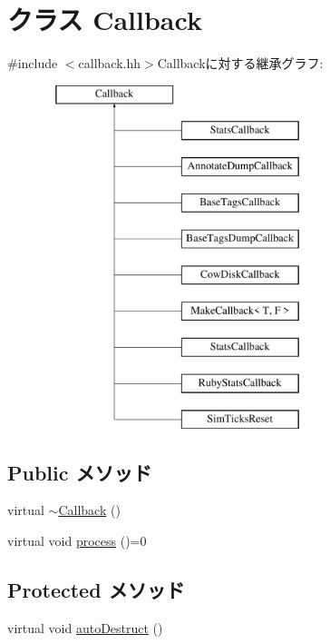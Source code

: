 \hypertarget{classCallback}{
\section{クラス Callback}
\label{classCallback}
}


{\ttfamily \#include $<$callback.hh$>$}Callbackに対する継承グラフ:\begin{figure}[H]
\begin{center}
\leavevmode
\includegraphics[height=10cm]{classCallback}
\end{center}
\end{figure}
\subsection*{Public メソッド}
\begin{DoxyCompactItemize}
\item 
virtual \hyperlink{classCallback_afdd27f2a21e4fdc3687ee72aae117e7d}{$\sim$Callback} ()
\item 
virtual void \hyperlink{classCallback_a142b75b68a6291400e20fb0dd905b1c8}{process} ()=0
\end{DoxyCompactItemize}
\subsection*{Protected メソッド}
\begin{DoxyCompactItemize}
\item 
virtual void \hyperlink{classCallback_a6885801d71ec8b4040427994c5fd8dcf}{autoDestruct} ()
\end{DoxyCompactItemize}
